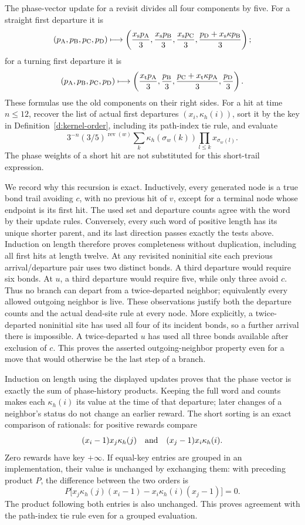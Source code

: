 The phase-vector update for a revisit divides all four components
by five. For a straight first departure it is
\[
 (p_{\rm A},p_{\rm B},p_{\rm C},p_{\rm D})\longmapsto
 \left(\frac{x_{\rm s}p_{\rm A}}3,
       \frac{x_{\rm s}p_{\rm B}}3,
       \frac{x_{\rm s}p_{\rm C}}3,
       \frac{p_{\rm D}+x_{\rm s}\kappa p_{\rm B}}3\right);
\]
for a turning first departure it is
\[
 (p_{\rm A},p_{\rm B},p_{\rm C},p_{\rm D})\longmapsto
 \left(\frac{x_{\rm t}p_{\rm A}}3,
       \frac{p_{\rm B}}3,
       \frac{p_{\rm C}+x_{\rm t}\kappa p_{\rm A}}3,
       \frac{p_{\rm D}}3\right).
\]
These formulas use the old components on their right sides.
For a hit at time \(n\le12\), recover the list of actual first
departures \((x_i,\kappa_h(i))\), sort it by the key in
Definition~\ref{d:kernel-order}, including its path-index tie rule,
and evaluate
\[
 3^{-n}(3/5)^{\operatorname{rev}(w)}
       \sum_k\kappa_h(\sigma_w(k))\prod_{l\le k}x_{\sigma_w(l)}.
\]
The phase weights of a short hit are not substituted for this
short-trail expression.

We record why this recursion is exact. Inductively, every generated
node is a true bond trail avoiding \(c\), with no previous hit of
\(v\), except for a terminal node whose endpoint is its first
hit. The used set and departure counts agree with the word by
their update rules. Conversely, every such word of positive length
has its unique shorter parent, and its last direction passes
exactly the tests above. Induction on length therefore proves
completeness without duplication, including all first hits at
length twelve. At any revisited noninitial site each previous
arrival/departure pair uses two distinct bonds. A third departure
would require six bonds. At \(u\), a third departure would require
five, while only three avoid \(c\). Thus no branch can depart
from a twice-departed neighbor; equivalently every allowed outgoing
neighbor is live. These observations justify both the departure
counts and the actual dead-site rule at every node. More explicitly,
a twice-departed noninitial site has used all four of its incident
bonds, so a further arrival there is impossible. A twice-departed
\(u\) has used all three bonds available after exclusion of \(c\).
This proves the asserted outgoing-neighbor property even for a
move that would otherwise be the last step of a branch.

Induction on length using the displayed updates proves that the
phase vector is exactly the sum of phase-history products. Keeping
the full word and counts makes each \(\kappa_h(i)\) its value at
the time of that departure; later changes of a neighbor's status
do not change an earlier reward. The short sorting is an exact
comparison of rationals: for positive rewards compare
\[
 (x_i-1)x_j\kappa_h(j)\quad\hbox{and}\quad
 (x_j-1)x_i\kappa_h(i).
\]
Zero rewards have key \(+\infty\). If equal-key entries are grouped
in an implementation, their value is unchanged by exchanging
them: with preceding product \(P\), the difference between the
two orders is
\[
 P\bigl[x_j\kappa_h(j)(x_i-1)
         -x_i\kappa_h(i)(x_j-1)\bigr]=0.
\]
The product following both entries is also unchanged. This proves
agreement with the path-index tie rule even for a grouped evaluation.

